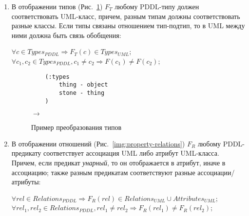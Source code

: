 \documentclass[a4paper,14pt]{extreport}
\begin{document}
    \begin{enumerate}
        \item В отображении типов (Рис.~\ref{img:property-types}) $F_T$ любому PDDL-типу должен соответствовать UML-класс, причем, разным типам должны соответствовать разные классы. Если типы связаны отношением тип-подтип, то в UML между ними должна быть связь обобщения:
    
        \begin{center}
            $\forall c \in Types_{PDDL} \Rightarrow F_T(c) \in Types_{UML}$; \\
            $\forall c_1, c_2 \in Types_{PDDL}, c_1 \neq c_2 \Rightarrow F(c_1) \neq F(c_2)$;
        \end{center}
                 

        
\begin{figure}[h]
    \hfill
    \begin{minipage}[h]{0.40\linewidth}
        {\raggedright
        \begin{verbatim}
    (:types
        thing - object
        stone - thing
    )
        \end{verbatim} 
        }
    \end{minipage}
    \hfill
    $\rightarrow$
    \hfill
    \begin{minipage}[h]{0.45\linewidth}
    \end{minipage}
    \caption{Пример преобразования типов}
    \label{img:property-types}
\end{figure}
   

        \item В отображении отношений (Рис.~\ref{img:property-relations}) $F_R$ любому PDDL-предикату соответствует ассоциация UML либо атрибут UML-класса. Причем, если предикат \textit{унарный}, то он отображается в атрибут, иначе в ассоциацию; также разным предикатам соответствуют разные ассоциации/атрибуты:
    
        \begin{center}
        $\forall rel \in Relations_{PDDL} \Rightarrow F_R(rel) \in Relations_{UML} \cup Attributes_{UML}$;\\
        $\forall rel_1, rel_2 \in Relations_{PDDL}, rel_1 \neq rel_2 \Rightarrow F_R(rel_1) \neq F_R(rel_2)$; \\
        \end{center}


\end{enumerate}
\end{document}
